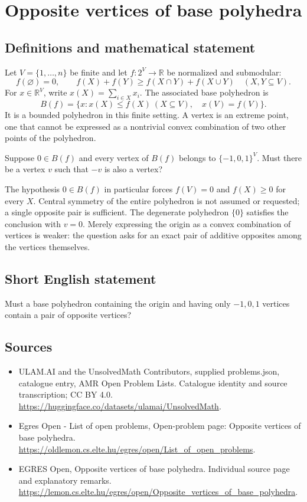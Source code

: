 \documentclass[11pt,a4paper]{article}
\begin{document}
\section*{Opposite vertices of base polyhedra}\label{statement}

\subsection{Definitions and mathematical statement}
Let $V=\{1,\ldots,n\}$ be finite and let $f:2^V\to\mathbb R$ be
normalized and submodular:
\[
 f(\varnothing)=0,\qquad
 f(X)+f(Y)\ge f(X\cap Y)+f(X\cup Y)\quad(X,Y\subseteq V).
\]
For $x\in\mathbb R^V$, write $x(X)=\sum_{i\in X}x_i$.
The associated base polyhedron is
\[
            B(f)=\{x:x(X)\le f(X)\ (X\subseteq V),\quad x(V)=f(V)\}.
\]
It is a bounded polyhedron in this finite setting. A vertex is an
extreme point, one that cannot be expressed as a nontrivial convex
combination of two other points of the polyhedron.

Suppose $0\in B(f)$ and every vertex of $B(f)$ belongs to
$\{-1,0,1\}^V$. Must there be a vertex $v$ such that $-v$ is also
a vertex?

The hypothesis $0\in B(f)$ in particular forces $f(V)=0$ and
$f(X)\ge0$ for every $X$. Central symmetry of the entire polyhedron
is not assumed or requested; a single opposite pair is sufficient.
The degenerate polyhedron $\{0\}$ satisfies the conclusion with
$v=0$. Merely expressing the origin as a convex combination of
vertices is weaker: the question asks for an exact pair of additive
opposites among the vertices themselves.
\subsection{Short English statement}
Must a base polyhedron containing the origin and having only
$-1,0,1$ vertices contain a pair of opposite vertices?
\subsection{Sources}
\begin{itemize}
\item[S1] ULAM.AI and the UnsolvedMath Contributors, supplied problems.json, catalogue entry, AMR Open Problem Lists. Catalogue identity and source transcription; CC BY 4.0.
\url{https://huggingface.co/datasets/ulamai/UnsolvedMath}.
\item[S2] Egres Open - List of open problems, Open-problem page: Opposite vertices of base polyhedra. 
\url{https://oldlemon.cs.elte.hu/egres/open/List_of_open_problems}.
\item[S3] EGRES Open, Opposite vertices of base polyhedra. Individual source page and explanatory remarks.
\url{https://lemon.cs.elte.hu/egres/open/Opposite_vertices_of_base_polyhedra}.
\end{itemize}
\end{document}
